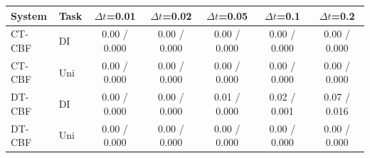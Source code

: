 \begin{tabular}{llccccc}
\hline
System & Task & $\Delta t$=0.01 & $\Delta t$=0.02 & $\Delta t$=0.05 & $\Delta t$=0.1 & $\Delta t$=0.2 \\
\hline
CT-CBF & DI & 0.00 / 0.000 & 0.00 / 0.000 & 0.00 / 0.000 & 0.00 / 0.000 & 0.00 / 0.000 \\
CT-CBF & Uni & 0.00 / 0.000 & 0.00 / 0.000 & 0.00 / 0.000 & 0.00 / 0.000 & 0.00 / 0.000 \\
DT-CBF & DI & 0.00 / 0.000 & 0.00 / 0.000 & 0.01 / 0.000 & 0.02 / 0.001 & 0.07 / 0.016 \\
DT-CBF & Uni & 0.00 / 0.000 & 0.00 / 0.000 & 0.00 / 0.000 & 0.00 / 0.000 & 0.00 / 0.000 \\
\hline
\end{tabular}
